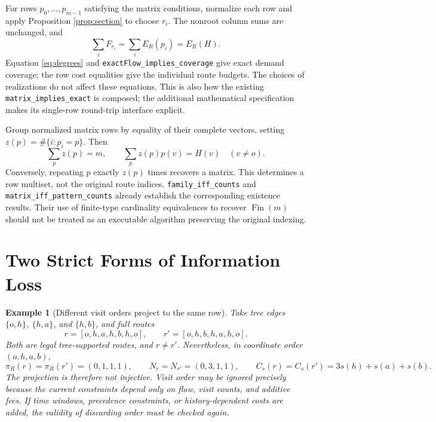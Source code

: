 \documentclass[11pt]{article}
\newtheorem{example}[proposition]{Example}
\theoremstyle{remark}
\newcommand{\code}[1]{\nolinkurl{#1}}
\begin{document}
For rows $p_0,\ldots,p_{m-1}$ satisfying the matrix conditions, normalize each row and apply Proposition
\ref{prop:section} to choose $r_i$. The nonroot column sums are unchanged, and
\[
 \sum_iF_{r_i}=\sum_iE_R(p_i)=E_R(H).
\]
Equation \eqref{eq:degrees} and \code{exactFlow_implies_coverage} give exact demand coverage;
the row cost equalities give the individual route budgets. The choices of realizations do not affect these equations.
This is also how the existing \code{matrix_implies_exact} is composed; the additional mathematical specification makes its single-row round-trip interface explicit.

Group normalized matrix rows by equality of their complete vectors, setting
$z(p)=\#\{i:p_i=p\}$. Then
\[
 \sum_pz(p)=m,\qquad \sum_pz(p)p(v)=H(v)\quad(v\neq o).
\]
Conversely, repeating $p$ exactly $z(p)$ times recovers a matrix.
This determines a row multiset, not the original route indices.
\code{family_iff_counts} and \code{matrix_iff_pattern_counts}
already establish the corresponding existence results.
Their use of finite-type cardinality equivalences to recover $\operatorname{Fin}(m)$ should not be treated as an executable algorithm preserving the original indexing.

\section{Two Strict Forms of Information Loss}

\begin{example}[Different visit orders project to the same row]
Take tree edges $\{o,h\}$, $\{h,a\}$, and $\{h,b\}$, and full routes
\[
 r=[o,h,a,h,b,h,o],\qquad r'=[o,h,b,h,a,h,o].
\]
Both are legal tree-supported routes, and $r\neq r'$. Nevertheless, in coordinate order $(o,h,a,b)$,
\[
 \pi_R(r)=\pi_R(r')=(0,1,1,1),\qquad
 N_r=N_{r'}=(0,3,1,1),\qquad
 C_s(r)=C_s(r')=3s(h)+s(a)+s(b).
\]
The projection is therefore not injective. Visit order may be ignored precisely because the current constraints depend only on flow, visit counts, and additive fees.
If time windows, precedence constraints, or history-dependent costs are added, the validity of discarding order must be checked again.
\end{example}
\end{document}
